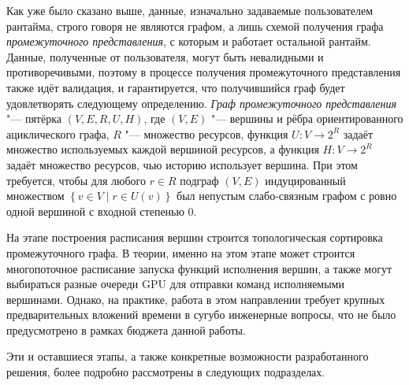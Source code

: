 Как уже было сказано выше, данные, изначально задаваемые пользователем рантайма, строго говоря не являются графом, а лишь схемой получения графа \textit{промежуточного представления}, с которым и работает остальной рантайм.
Данные, полученные от пользователя, могут быть невалидными и противоречивыми, поэтому в процессе получения промежуточного представления также идёт валидация, и гарантируется, что получившийся граф будет удовлетворять следующему определению.
\textit{Граф промежуточного представления} "--- пятёрка $(V, E, R, U, H)$, где $(V, E)$ "--- вершины и рёбра ориентированного ациклического графа, $R$ "--- множество ресурсов, функция $U : V \to 2^R$ задаёт множество используемых каждой вершиной ресурсов, а функция $H : V \to 2^R$ задаёт множество ресурсов, чью историю использует вершина.
При этом требуется, чтобы для любого $r\in R$ подграф $(V, E)$ индуцированный множеством $\left\{v \in V \middle| r \in U(v)\right\}$ был непустым слабо-связным графом с ровно одной вершиной с входной степенью $0$.

На этапе построения расписания вершин строится топологическая сортировка промежуточного графа.
В теории, именно на этом этапе может строится многопоточное расписание запуска функций исполнения вершин, а также могут выбираться разные очереди GPU для отправки команд исполняемыми вершинами.
Однако, на практике, работа в этом направлении требует крупных предварительных вложений времени в сугубо инженерные вопросы, что не было предусмотрено в рамках бюджета данной работы.

Эти и оставшиеся этапы, а также конкретные возможности разработанного решения, более подробно рассмотрены в следующих подразделах.

